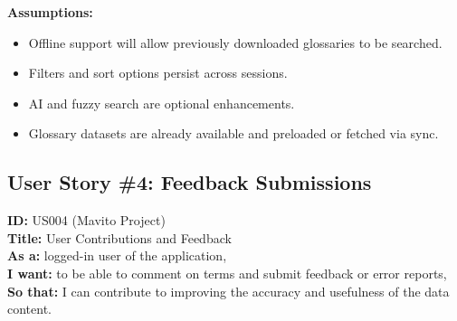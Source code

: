 \documentclass[12pt]{article}
\begin{document}
\vspace{1em}
\textbf{Assumptions:}
\begin{itemize}
    \item Offline support will allow previously downloaded glossaries to be searched.
    \item Filters and sort options persist across sessions.
    \item AI and fuzzy search are optional enhancements.
    \item Glossary datasets are already available and preloaded or fetched via sync.
\end{itemize}

\subsection{User Story \#4: Feedback Submissions}
\textbf{ID:} US004 (Mavito Project) \\
\textbf{Title:} User Contributions and Feedback \\
\textbf{As a:} logged-in user of the application, \\
\textbf{I want:} to be able to comment on terms and submit feedback or error reports, \\
\textbf{So that:} I can contribute to improving the accuracy and usefulness of the data content.
\end{document}
